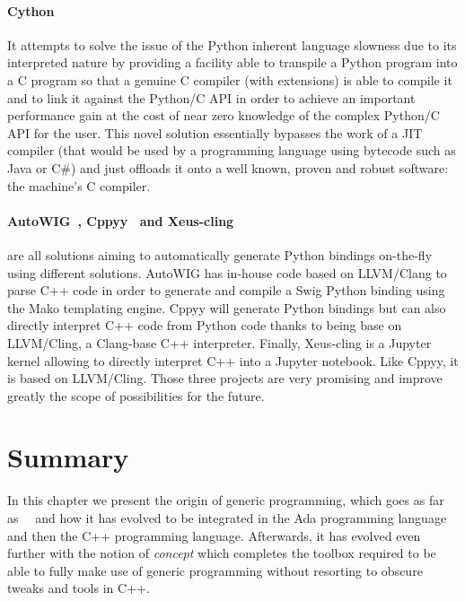 \paragraph{Cython~\parencite{behnel.2010.cython}} It attempts to solve the issue of the Python inherent language
slowness due to its interpreted nature by providing a facility able to transpile a Python program into a C program so
that a genuine C compiler (with extensions) is able to compile it and to link it against the Python/C API in order to
achieve an important performance gain at the cost of near zero knowledge of the complex Python/C API for the user. This
novel solution essentially bypasses the work of a JIT compiler (that would be used by a programming language using
bytecode such as Java or C\#) and just offloads it onto a well known, proven and robust software: the machine's C
compiler.

\paragraph{AutoWIG~\parencite{fernique.2018.autowig}, Cppyy~\parencite{wimtlplavrijsen.2016.cppyy} and
  Xeus-cling~\parencite{quantstack.2021.xeus-cling}} are all solutions aiming to automatically generate Python bindings
on-the-fly using different solutions. AutoWIG has in-house code based on LLVM/Clang to parse C++ code in order to
generate and compile a Swig Python binding using the Mako templating engine. Cppyy will generate Python bindings but can
also directly interpret C++ code from Python code thanks to being base on LLVM/Cling, a Clang-base C++ interpreter.
Finally, Xeus-cling is a Jupyter~\parencite{kluyver.2016.jupyter} kernel allowing to directly interpret C++ into a
Jupyter notebook. Like Cppyy, it is based on LLVM/Cling. Those three projects are very promising and improve greatly the
scope of possibilities for the future.


\section{Summary}

In this chapter we present the origin of generic programming, which goes as far
as~~\parencite{atkinson.1978.cluimpl} and how it has evolved to be integrated in the Ada
programming language and then the C++ programming language. Afterwards, it has evolved even further with the notion of
\emph{concept} which completes the toolbox required to be able to fully make use of generic programming without
resorting to obscure tweaks and tools in C++.

